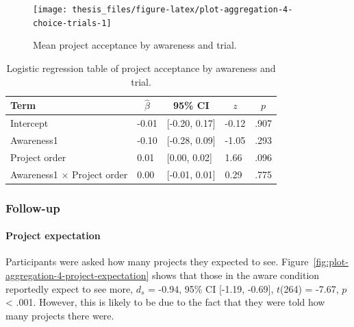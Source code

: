\documentclass[a4paper, nobind, dvipsnames]{templates/ociamthesis}
\theoremstyle{definition}
\theoremstyle{definition}
\theoremstyle{definition}
\theoremstyle{definition}
\theoremstyle{remark}
\begin{document}
\begin{figure}
\texttt{[image: thesis\_files/figure-latex/plot-aggregation-4-choice-trials-1]} \caption{Mean project acceptance by awareness and trial.}\label{fig:plot-aggregation-4-choice-trials}
\end{figure}

\begin{table}[tbp]

\begin{center}
\begin{threeparttable}

\caption{\label{tab:awareness-project-order}Logistic regression table of project acceptance by awareness and trial.}

\begin{tabular}{lllll}
\toprule
Term & \multicolumn{1}{c}{$\hat{\beta}$} & \multicolumn{1}{c}{95\% CI} & \multicolumn{1}{c}{$z$} & \multicolumn{1}{c}{$p$}\\
\midrule
Intercept & -0.01 & {}[-0.20, 0.17] & -0.12 & .907\\
Awareness1 & -0.10 & {}[-0.28, 0.09] & -1.05 & .293\\
Project order & 0.01 & {}[0.00, 0.02] & 1.66 & .096\\
Awareness1 $\times$ Project order & 0.00 & {}[-0.01, 0.01] & 0.29 & .775\\
\bottomrule
\end{tabular}

\end{threeparttable}
\end{center}

\end{table}

\subsubsection{Follow-up}

\paragraph{Project expectation}

Participants were asked how many projects they expected to see.
Figure~\ref{fig:plot-aggregation-4-project-expectation} shows that those in the
aware condition reportedly expect to see more,
\(d_s\) = -0.94, 95\% CI {[}-1.19, -0.69{]}, \(t\)(264) = -7.67, \(p\) \textless{} .001. However, this is likely to be due to
the fact that they were told how many projects there were.
\end{document}

